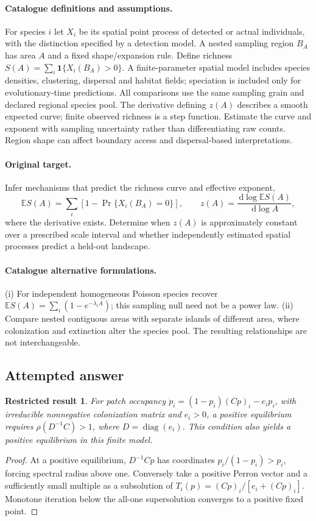 \documentclass[11pt]{article}
\newcommand{\E}{\mathbb E}
\newcommand{\dd}{\,\mathrm d}
\providecommand{\E}{\mathbb E}
\newtheorem{attemptresult}{Restricted result}[section]
\begin{document}
\paragraph{Catalogue definitions and assumptions.}
For species $i$ let $X_i$ be its spatial point process of detected or actual individuals, with the distinction specified by a detection model. A nested sampling region $B_A$ has area $A$ and a fixed shape/expansion rule. Define richness $S(A)=\sum_i\mathbf1\{X_i(B_A)>0\}$. A finite-parameter spatial model includes species densities, clustering, dispersal and habitat fields; speciation is included only for evolutionary-time predictions. All comparisons use the same sampling grain and declared regional species pool. The derivative defining $z(A)$ describes a smooth expected curve; finite observed richness is a step function. Estimate the curve and exponent with sampling uncertainty rather than differentiating raw counts. Region shape can affect boundary access and dispersal-based interpretations.
\paragraph{Original target.}
Infer mechanisms that predict the richness curve and effective exponent,
\[
 \E S(A)=\sum_i[1-\Pr\{X_i(B_A)=0\}],\qquad
 z(A)=\frac{\dd\log\E S(A)}{\dd\log A},
\]
where the derivative exists. Determine when $z(A)$ is approximately constant over a prescribed scale interval and whether independently estimated spatial processes predict a held-out landscape.
\paragraph{Catalogue alternative formulations.}
(i) For independent homogeneous Poisson species recover $\E S(A)=\sum_i(1-e^{-\lambda_iA})$; this sampling null need not be a power law. (ii) Compare nested contiguous areas with separate islands of different area, where colonization and extinction alter the species pool. The resulting relationships are not interchangeable.
\subsection{Attempted answer}
\begin{attemptresult}
For patch occupancy $\dot p_i=(1-p_i)(Cp)_i-e_ip_i$, with irreducible nonnegative colonization matrix and $e_i>0$, a positive equilibrium requires $\rho(D^{-1}C)>1$, where $D=\operatorname{diag}(e_i)$. This condition also yields a positive equilibrium in this finite model.
\end{attemptresult}
\begin{proof}
At a positive equilibrium, $D^{-1}Cp$ has coordinates $p_i/(1-p_i)>p_i$, forcing spectral radius above one. Conversely take a positive Perron vector and a sufficiently small multiple as a subsolution of $T_i(p)=(Cp)_i/[e_i+(Cp)_i]$. Monotone iteration below the all-one supersolution converges to a positive fixed point.
\end{proof}
\end{document}
